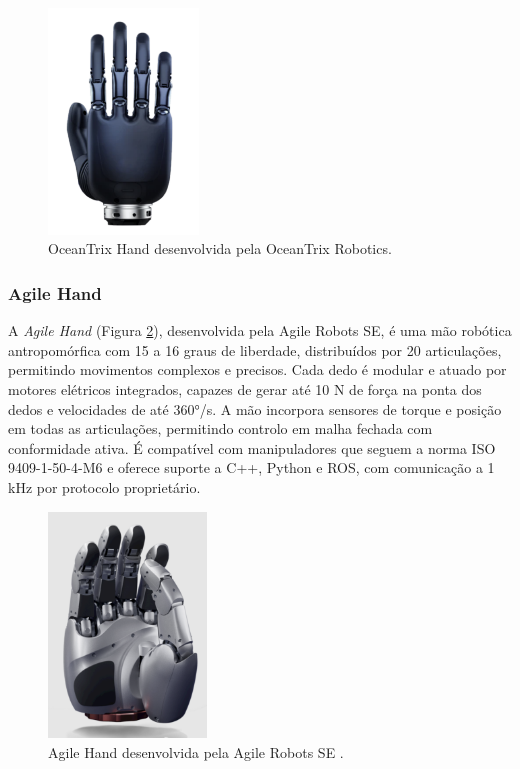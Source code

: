 \begin{figure}[H]
    \centering
    \includegraphics[height=6cm]{figs/chapter2/oceantrix.png}
    \caption{OceanTrix Hand desenvolvida pela  OceanTrix Robotics\cite{oceantrix}.}
    \label{fig:oceantrix}
    
\end{figure}



\subsubsection{Agile Hand}

A \textit{Agile Hand} (Figura \ref{fig:agile}), desenvolvida pela Agile Robots SE, é uma mão robótica antropomórfica com 15 a 16 graus de liberdade, distribuídos por 20 articulações, permitindo movimentos complexos e precisos. Cada dedo é modular e atuado por motores elétricos integrados, capazes de gerar até 10 N de força na ponta dos dedos e velocidades de até 360°/s. A mão incorpora sensores de torque e posição em todas as articulações, permitindo controlo em malha fechada com conformidade ativa. É compatível com manipuladores que seguem a norma ISO 9409-1-50-4-M6 e oferece suporte a C++, Python e ROS, com comunicação a 1 kHz por protocolo proprietário\cite{agile}.

\begin{figure}[H]
    \centering
    \includegraphics[height=6cm]{figs/chapter2/agile.png}
    \caption{Agile Hand desenvolvida pela Agile Robots SE \cite{agile}.}
    \label{fig:agile}
    
\end{figure}


